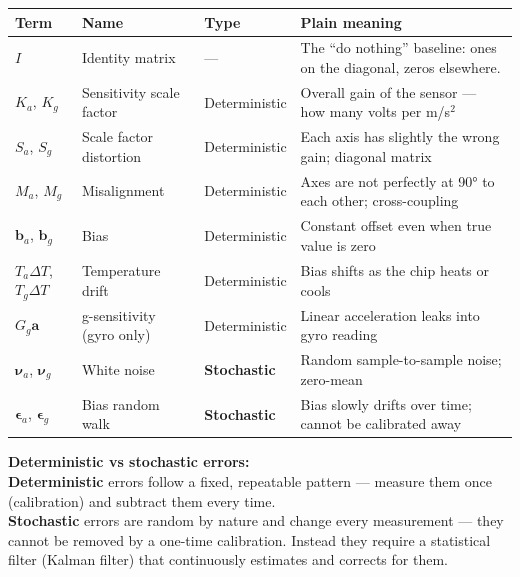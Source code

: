 \documentclass[12pt, a4paper]{article}
\begin{document}
\begin{center}
\renewcommand{\arraystretch}{1.6}
\begin{tabular}{p{1.2cm} p{3.8cm} p{3.5cm} p{4.5cm}}
  \toprule
  \textbf{Term} & \textbf{Name} & \textbf{Type} & \textbf{Plain meaning} \\
  \midrule
  $I$
    & Identity matrix 
    & ---
    & The ``do nothing'' baseline: ones on the diagonal, zeros elsewhere.
     \\
  $K_a$, $K_g$
    & Sensitivity scale factor
    & Deterministic
    & Overall gain of the sensor --- how many volts per m/s$^2$ \\
  $S_a$, $S_g$
    & Scale factor distortion
    & Deterministic
    & Each axis has slightly the wrong gain; diagonal matrix \\
  $M_a$, $M_g$
    & Misalignment
    & Deterministic
    & Axes are not perfectly at 90° to each other; cross-coupling \\
  $\mathbf{b}_a$, $\mathbf{b}_g$
    & Bias
    & Deterministic
    & Constant offset even when true value is zero \\
  $T_a\Delta T$, $T_g\Delta T$
    & Temperature drift
    & Deterministic
    & Bias shifts as the chip heats or cools \\
  $G_g\mathbf{a}$
    & g-sensitivity (gyro only)
    & Deterministic
    & Linear acceleration leaks into gyro reading \\
  $\boldsymbol{\nu}_a$, $\boldsymbol{\nu}_g$
    & White noise
    & \textbf{Stochastic}
    & Random sample-to-sample noise; zero-mean \\
  $\boldsymbol{\epsilon}_a$, $\boldsymbol{\epsilon}_g$
    & Bias random walk
    & \textbf{Stochastic}
    & Bias slowly drifts over time; cannot be calibrated away \\
  \bottomrule
\end{tabular}
\end{center}

\begin{notebox}
  \textbf{Deterministic vs stochastic errors:}\\
  \textbf{Deterministic} errors follow a fixed, repeatable pattern ---
  measure them once (calibration) and subtract them every time.\\[4pt]
  \textbf{Stochastic} errors are random by nature and change every
  measurement --- they cannot be removed by a one-time calibration.
  Instead they require a statistical filter (Kalman filter) that
  continuously estimates and corrects for them.
\end{notebox}
\end{document}
